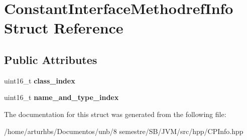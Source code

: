 \hypertarget{structConstantInterfaceMethodrefInfo}{}\section{Constant\+Interface\+Methodref\+Info Struct Reference}
\label{structConstantInterfaceMethodrefInfo}
\subsection*{Public Attributes}
\begin{DoxyCompactItemize}
\item 
uint16\+\_\+t {\bfseries class\+\_\+index}\hypertarget{structConstantInterfaceMethodrefInfo_aa247e63af32e9dfdb7ab9a76dcfbc679}{}\label{structConstantInterfaceMethodrefInfo_aa247e63af32e9dfdb7ab9a76dcfbc679}

\item 
uint16\+\_\+t {\bfseries name\+\_\+and\+\_\+type\+\_\+index}\hypertarget{structConstantInterfaceMethodrefInfo_a876fd6bf106f42e54e35ff401e61b88b}{}\label{structConstantInterfaceMethodrefInfo_a876fd6bf106f42e54e35ff401e61b88b}

\end{DoxyCompactItemize}


The documentation for this struct was generated from the following file\+:\begin{DoxyCompactItemize}
\item 
/home/arturhbs/\+Documentos/unb/8 semestre/\+S\+B/\+J\+V\+M/src/hpp/C\+P\+Info.\+hpp\end{DoxyCompactItemize}
